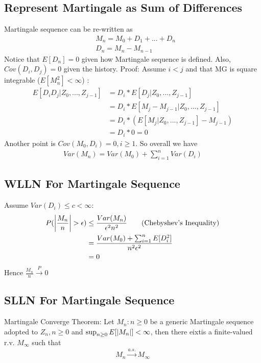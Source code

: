 \subsection{Represent Martingale as Sum of Differences} 
Martingale sequence can be re-written as 
    \begin{align*}
        & M_n = M_0 + D_1 + ... + D_n \\
        & D_n = M_n - M_{n-1}
    \end{align*}
Notice that $E[D_n] = 0$ given how Martingale sequence is defined. Also, $Cov(D_i, D_j) = 0$ given the history.
Proof: Assume $i < j$ and that MG is square integrable ($E[M_n^2] < \infty$) : 
    \begin{align*}
        E[D_i D_j | Z_0, ..., Z_{j-1}] 
        & = D_i * E[D_j | Z_0, ..., Z_{j-1}] \\
        & = D_i * E[M_j - M_{j-1} | Z_0, ..., Z_{j-1}] \\
        & = D_i * (E[M_j | Z_0, ..., Z_{j-1}] - M_{j-1}) \\
        & = D_i * 0 = 0
    \end{align*}
Another point is $Cov(M_0, D_i) = 0, i \geq 1$. So overall we have 
    \begin{align*}
        Var(M_n) = Var(M_0) + \sum_{i=1}^n Var(D_i)
    \end{align*}

\subsection{WLLN For Martingale Sequence} 
Assume $Var(D_i) \leq c < \infty$:
\begin{align*}
    P(\left| \frac{M_n}{n} \right| > \epsilon) 
    & \leq \frac{Var(M_n)}{\epsilon^2n^2} \tag{Chebyshev's Inequality}\\
    & = \frac{Var(M_0) + \sum_{i=1}^n E[D_i^2]}{n^2\epsilon^2}\\
    & = 0
\end{align*}
Hence $\frac{M_n}{n}\overset{P}{\to} 0$


\subsection{SLLN For Martingale Sequence} 
Martingale Converge Theorem: Let $M_n: n\geq 0$ be a generic Martingale sequence adopted to $Z_n, n \geq 0$ and $\sup_{n\geq 0}E[\left| M_n \right|] < \infty$, then there eixtis a finite-valued r.v. $M_\infty$ such that 
    \begin{align*}
        M_n \overset{a.s.}{\to} M_\infty
    \end{align*}

